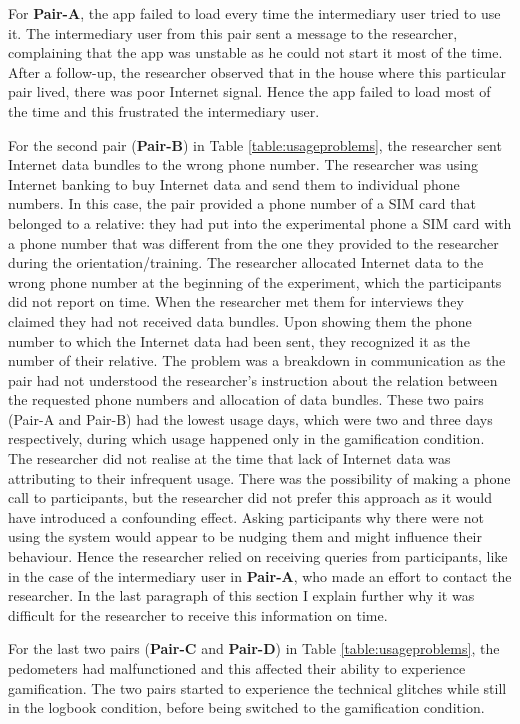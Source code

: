 For \textbf{Pair-A}, the app failed to load every time the intermediary user tried to use it. The intermediary user from this pair sent a message to the researcher, complaining that the app was unstable as he could not start it most of the time. After a follow-up, the researcher observed that in the house where this particular pair lived, there was poor Internet signal. Hence the app failed to load most of the time and this frustrated the intermediary user.

For the second pair (\textbf{Pair-B}) in Table \ref{table:usageproblems}, the researcher sent Internet data bundles to the wrong phone number. The researcher was using Internet banking to buy Internet data and send them to individual phone numbers. In this case, the pair provided a phone number of a SIM card that belonged to a relative: they had put into the experimental phone a SIM card with a phone number that was different from the one they provided to the researcher during the orientation/training. The researcher allocated Internet data to the wrong phone number at the beginning of the experiment, which the participants did not report on time. When the researcher met them for interviews they claimed they had not received data bundles. Upon showing them the phone number to which the Internet data had been sent, they recognized it as the number of their relative. The problem was a breakdown in communication as the pair had not understood the researcher's instruction about the relation between the requested phone numbers and allocation of data bundles. These two pairs (Pair-A and Pair-B) had the lowest usage days, which were two and three days respectively, during which usage happened only in the gamification condition. The researcher did not realise at the time that lack of Internet data was attributing to their infrequent usage. There was the possibility of making a phone call to participants, but the researcher did not prefer this approach as it would have introduced a confounding effect. Asking participants why there were not using the system would appear to be nudging them and might influence their behaviour. Hence the researcher relied on receiving queries from participants, like in the case of the intermediary user in \textbf{Pair-A}, who made an effort to contact the researcher. In the last paragraph of this section I explain further why it was difficult for the researcher to receive this information on time.
 
For the last two pairs (\textbf{Pair-C} and \textbf{Pair-D}) in Table \ref{table:usageproblems}, the pedometers had malfunctioned and this affected their ability to experience gamification. The two pairs started to experience the technical glitches while still in the logbook condition, before being switched to the gamification condition.

